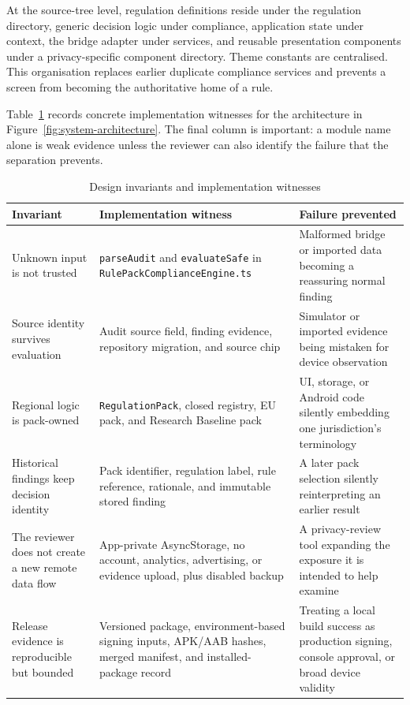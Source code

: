 At the source-tree level, regulation definitions reside under the regulation directory, generic decision logic under compliance, application state under context, the bridge adapter under services, and reusable presentation components under a privacy-specific component directory. Theme constants are centralised. This organisation replaces earlier duplicate compliance services and prevents a screen from becoming the authoritative home of a rule.

Table~\ref{tab:implementation-witnesses} records concrete implementation witnesses for the architecture in Figure~\ref{fig:system-architecture}. The final column is important: a module name alone is weak evidence unless the reviewer can also identify the failure that the separation prevents.

\begin{table}[H]
\centering
\caption{Design invariants and implementation witnesses}
\label{tab:implementation-witnesses}
\scriptsize
\begin{tabular}{>{\raggedright\arraybackslash}p{}>{\raggedright\arraybackslash}p{}>{\raggedright\arraybackslash}p{}}
\toprule
Invariant & Implementation witness & Failure prevented \\
\midrule
Unknown input is not trusted & \texttt{parseAudit} and \texttt{evaluateSafe} in \texttt{RulePackComplianceEngine.ts} & Malformed bridge or imported data becoming a reassuring normal finding \\
Source identity survives evaluation & Audit source field, finding evidence, repository migration, and source chip & Simulator or imported evidence being mistaken for device observation \\
Regional logic is pack-owned & \texttt{RegulationPack}, closed registry, EU pack, and Research Baseline pack & UI, storage, or Android code silently embedding one jurisdiction's terminology \\
Historical findings keep decision identity & Pack identifier, regulation label, rule reference, rationale, and immutable stored finding & A later pack selection silently reinterpreting an earlier result \\
The reviewer does not create a new remote data flow & App-private AsyncStorage, no account, analytics, advertising, or evidence upload, plus disabled backup & A privacy-review tool expanding the exposure it is intended to help examine \\
Release evidence is reproducible but bounded & Versioned package, environment-based signing inputs, APK/AAB hashes, merged manifest, and installed-package record & Treating a local build success as production signing, console approval, or broad device validity \\
\bottomrule
\end{tabular}
\end{table}

